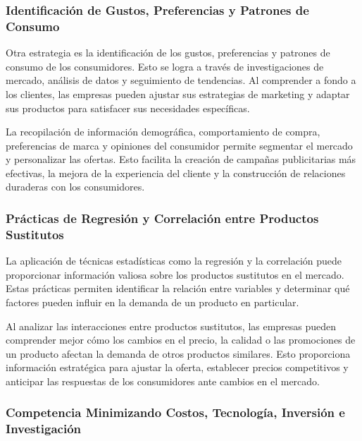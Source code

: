 \documentclass[
  a4paper,
]{article}
\theoremstyle{definition}
\theoremstyle{remark}
\begin{document}
\hypertarget{identificaciuxf3n-de-gustos-preferencias-y-patrones-de-consumo}{%
\subsubsection{Identificación de Gustos, Preferencias y Patrones de
Consumo}\label{identificaciuxf3n-de-gustos-preferencias-y-patrones-de-consumo}}

Otra estrategia es la identificación de los gustos, preferencias y
patrones de consumo de los consumidores. Esto se logra a través de
investigaciones de mercado, análisis de datos y seguimiento de
tendencias. Al comprender a fondo a los clientes, las empresas pueden
ajustar sus estrategias de marketing y adaptar sus productos para
satisfacer sus necesidades específicas.

La recopilación de información demográfica, comportamiento de compra,
preferencias de marca y opiniones del consumidor permite segmentar el
mercado y personalizar las ofertas. Esto facilita la creación de
campañas publicitarias más efectivas, la mejora de la experiencia del
cliente y la construcción de relaciones duraderas con los consumidores.

\hypertarget{pruxe1cticas-de-regresiuxf3n-y-correlaciuxf3n-entre-productos-sustitutos}{%
\subsubsection{Prácticas de Regresión y Correlación entre Productos
Sustitutos}\label{pruxe1cticas-de-regresiuxf3n-y-correlaciuxf3n-entre-productos-sustitutos}}

La aplicación de técnicas estadísticas como la regresión y la
correlación puede proporcionar información valiosa sobre los productos
sustitutos en el mercado. Estas prácticas permiten identificar la
relación entre variables y determinar qué factores pueden influir en la
demanda de un producto en particular.

Al analizar las interacciones entre productos sustitutos, las empresas
pueden comprender mejor cómo los cambios en el precio, la calidad o las
promociones de un producto afectan la demanda de otros productos
similares. Esto proporciona información estratégica para ajustar la
oferta, establecer precios competitivos y anticipar las respuestas de
los consumidores ante cambios en el mercado.

\hypertarget{competencia-minimizando-costos-tecnologuxeda-inversiuxf3n-e-investigaciuxf3n}{%
\subsubsection{Competencia Minimizando Costos, Tecnología, Inversión e
Investigación}\label{competencia-minimizando-costos-tecnologuxeda-inversiuxf3n-e-investigaciuxf3n}}
\end{document}
